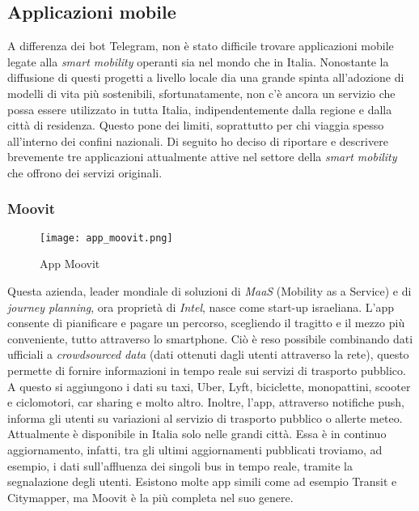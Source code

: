 \subsection{Applicazioni mobile}
A differenza dei bot Telegram, non è stato difficile trovare applicazioni mobile legate alla \textit{smart mobility} operanti sia nel mondo che in Italia. Nonostante la diffusione di questi progetti a livello locale dia una grande spinta all’adozione di modelli di vita più sostenibili, sfortunatamente, non c’è ancora un servizio che possa essere utilizzato in tutta Italia, indipendentemente dalla regione e dalla città di residenza. Questo pone dei limiti, soprattutto per chi viaggia spesso all’interno dei confini nazionali. Di seguito ho deciso di riportare e descrivere brevemente tre applicazioni attualmente attive nel settore della \textit{smart mobility} che offrono dei servizi originali.

\subsubsection{Moovit}

\begin{wrapfigure}{r}{0.50\textwidth}
\centering
\texttt{[image: app\_moovit.png]}
\caption{App Moovit}
\label{fig:app_moovit}
\end{wrapfigure}

 Questa azienda, leader mondiale di soluzioni di \textit{MaaS} (Mobility as a Service) e di \textit{journey planning}, ora proprietà di \textit{Intel}, nasce come start-up israeliana. L'app consente di pianificare e pagare un percorso, scegliendo il tragitto e il mezzo più conveniente, tutto attraverso lo smartphone. Ciò è reso possibile combinando dati ufficiali a \textit{crowdsourced data} (dati ottenuti dagli utenti attraverso la rete), questo permette di fornire informazioni in tempo reale sui servizi di trasporto pubblico. A questo si aggiungono i dati su taxi, Uber, Lyft, biciclette, monopattini, scooter e ciclomotori, car sharing e molto altro. Inoltre, l'app, attraverso notifiche push, informa gli utenti su variazioni al servizio di trasporto pubblico o allerte meteo. 
 Attualmente è disponibile in Italia solo nelle grandi città. Essa è in continuo aggiornamento, infatti, tra gli ultimi aggiornamenti pubblicati troviamo, ad esempio, i dati sull'affluenza dei singoli bus in tempo reale, tramite la segnalazione degli utenti. 
 Esistono molte app simili come ad esempio Transit e Citymapper, ma Moovit è la più completa nel suo genere.

